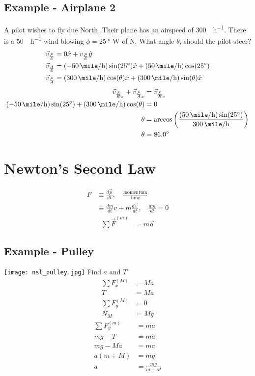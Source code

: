 \documentclass{article}
\begin{document}
\subsection{Example - Airplane 2}
A pilot wishes to fly due North. Their plane has an airspeed of \SI{300}{\mile \per \hour}. There is a \SI{50}{\mile \per \hour} wind blowing $ \phi = \SI{25}{\degree} $ W of N. What angle $ \theta $, should the pilot steer?
\begin{align*}
	\vec{v}_\frac{P}{E} & = 0\hat{x} + v_\frac{P}{E}\hat{y} \\
	\vec{v}_\frac{A}{E} & = (-\SI{50}{\mile \per \hour})\sin(\SI{25}{\degree})\hat{x} + (\SI{50}{\mile \per \hour})\cos(\SI{25}{\degree}) \\
	\vec{v}_\frac{P}{A} & = (\SI{300}{\mile \per \hour})\cos(\theta)\hat{x} + (\SI{300}{\mile \per \hour})\sin(\theta)\hat{x}
\end{align*}
\begin{align*}
	\vec{v}_{\frac{A}{E}_x} + \vec{v}_{\frac{P}{A}_x} & = \vec{v}_{\frac{P}{E}_x} \\
	(-\SI{50}{\mile \per \hour})\sin(\SI{25}{\degree}) + (\SI{300}{\mile \per \hour})\cos(\theta) & = 0 \\
	\theta & = \arccos \left( \frac{ (\SI{50}{\mile \per \hour})\sin(\SI{25}{\degree}) }{ \SI{300}{\mile \per \hour} } \right) \\
	\theta & = \SI{86.0}{\degree}
\end{align*}

\section{Newton's Second Law}

\begin{align}
	F & \equiv \frac{d\vec{p}}{dt}, \quad \frac{\text{momentum}}{\text{time}} \\
	  & \equiv \frac{dm}{dt}v + m\frac{d\vec{v}}{dt}, \quad \frac{dm}{dt} = 0
\end{align}
\begin{align}
	\sum \vec{F}^{(m)} & = m\vec{a}
\end{align}

\subsection{Example - Pulley}
\texttt{[image: nsl\_pulley.jpg]}
Find $ a $ and $ T $
\begin{align*}
	\sum F_{x}^{(M)} & = Ma \\
	T & = Ma
\end{align*}
\begin{align*}
	\sum F_{y}^{(M)} & = 0 \\
	N_M & = Mg
\end{align*}
\begin{align*}
	\sum F_y^{(m)} & = ma \\
	mg - T & = ma \\
	mg - Ma & = ma \\
	a(m + M) & = mg \\
	a & = \frac{mg}{m + M}
\end{align*}
\end{document}
